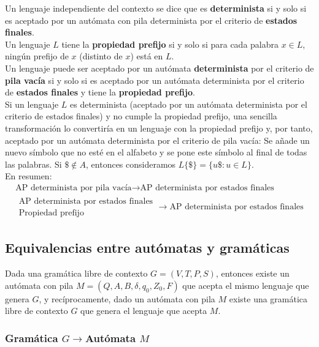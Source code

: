 \documentclass[11pt,titlepage,a4paper]{article}
\theoremstyle{ejemplo}
\theoremstyle{algoritmo}
\begin{document}
Un lenguaje independiente del contexto se dice que es \textbf{determinista} si y 
solo si es aceptado por un autómata con pila determinista por el criterio de 
\textbf{estados finales}.
\\

Un lenguaje $L$ tiene la \textbf{propiedad prefijo} si y solo si para cada 
palabra $x\in L$, ningún prefijo de $x$ (distinto de $x$) está en $L$.
\\

Un lenguaje puede ser aceptado por un autómata \textbf{determinista} por el 
criterio de \textbf{pila vacía} si y solo si es aceptado por un autómata 
determinista por el criterio de \textbf{estados finales} y tiene la 
\textbf{propiedad prefijo}.
\\

Si un lenguaje $L$ es determinista (aceptado por un autómata determinista por el criterio de estados finales) y no cumple la propiedad prefijo, una sencilla transformación lo convertiría en un lenguaje con la propiedad prefijo y, por tanto, aceptado por un autómata determinista por el criterio de pila vacía: Se añade un nuevo símbolo que no esté en el alfabeto y se pone este símbolo al final de todas las palabras. Si $\$\notin A$, entonces consideramos $L\{\$\}=\{u\$:u\in L\}$.
\\

En resumen:
\begin{gather*}
\text{AP determinista por pila vacía}\to\text{AP determinista por estados finales}
\\
%
\begin{array}{c}
\text{AP determinista por estados finales} \\
\text{Propiedad prefijo}
\end{array}
\to\text{AP determinista por estados finales}
\end{gather*}

\subsection{Equivalencias entre autómatas y gramáticas}

Dada una gramática libre de contexto $G=(V,T,P,S)$, entonces existe un autómata con pila $M=(Q,A,B,\delta,q_0,Z_0,F)$ que acepta el mismo lenguaje que genera 
$G$, y recíprocamente, dado un autómata con pila $M$ existe una gramática libre de contexto $G$ que genera el lenguaje que acepta $M$.

\subsubsection{Gramática $G\to$Autómata $M$}
\end{document}
